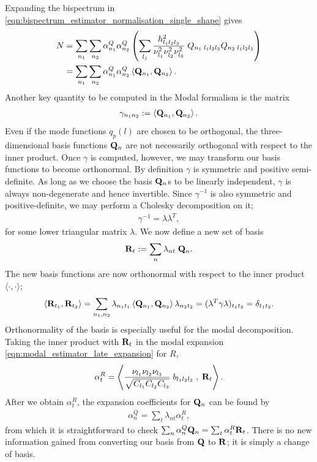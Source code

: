 Expanding the bispectrum in \eqref{eqn:bispectrum_estimator_normalisation_single_shape} gives
\begin{align}
	N &= \sum_{n_1} \sum_{n_2} \alpha^Q_{n_1} \alpha^Q_{n_2} \left( \sum_{l_j} \frac{h^2_{l_1 l_2 l_3}}{\nu_{l_1}^2 \nu_{l_2}^2 \nu_{l_3}^2 } \; Q_{n_1 \; l_1 l_2 l_3} Q_{n_2 \; l_1 l_2 l_3} \right) \\
	&= \sum_{n_1} \sum_{n_2} \alpha^Q_{n_1} \alpha^Q_{n_2} \left< \mathbf{Q}_{n_1}, \mathbf{Q}_{n_2} \right>. \label{eqn:modal_estimator_normalisation_Q}
\end{align}
Another key quantity to be computed in the Modal formalism is the matrix
\begin{align}
	\gamma_{n_1 n_2} :=  \left< \mathbf{Q}_{n_1} , \mathbf{Q}_{n_2} \right>.
\end{align}
Even if the mode functions $q_p(l)$ are chosen to be orthogonal, the three-dimensional basis functions $\mathbf{Q}_n$ are not necessarily orthogonal with respect to the inner product. Once $\gamma$ is computed, however, we may transform our basis functions to become orthonormal. By definition $\gamma$ is symmetric and positive semi-definite. As long as we choose the basis $\mathbf{Q}_n$s to be linearly independent, $\gamma$ is always non-degenerate and hence invertible. Since $\gamma^{-1}$ is also symmetric and positive-definite, we may perform a Cholesky decomposition on it;
\begin{align}
	\gamma^{-1} = \lambda \lambda^T,
\end{align}
for some lower triangular matrix $\lambda$. We now define a new set of basis
\begin{align}
	\mathbf{R}_t := \sum_n \lambda_{nt} \; \mathbf{Q}_{n}.
\end{align}
The new basis functions are now orthonormal with respect to the inner product $\langle \cdot,\cdot \rangle$;
\begin{align}
	\left< \mathbf{R}_{t_1} , \mathbf{R}_{t_2} \right> = \sum_{n_1,n_2} \lambda_{n_1 t_1} \left< \mathbf{Q}_{n_1} , \mathbf{Q}_{n_2} \right> \lambda_{n_2 t_2} = (\lambda^T \gamma \lambda)_{t_1 t_2} = \delta_{t_1 t_2}.
\end{align}
Orthonormality of the basis is especially useful for the modal decomposition. Taking the inner product with $\mathbf{R}_t$ in the modal expansion \eqref{eqn:modal_estimator_late_expansion} for $R$,
\begin{align}
	\alpha^R_t = \left< \frac{\nu_{l_1} \nu_{l_2} \nu_{l_3}}{\sqrt{C_{l_1} C_{l_2} C_{l_3}}} \; b_{l_1 l_2 l_3} \;,\; \mathbf{R}_t \right>.
\end{align}
After we obtain $\alpha^R_t$, the expansion coefficients for $\mathbf{Q}_n$ can be found by
\begin{align}
	\alpha^Q_n = \sum_t \lambda_{nt} \alpha^R_t,
\end{align}
from which it is straightforward to check $\sum_n \alpha^Q_n \mathbf{Q}_n = \sum_t \alpha^R_t \mathbf{R}_t$. There is no new information gained from converting our basis from $\mathbf{Q}$ to $\mathbf{R}$; it is simply a change of basis.

